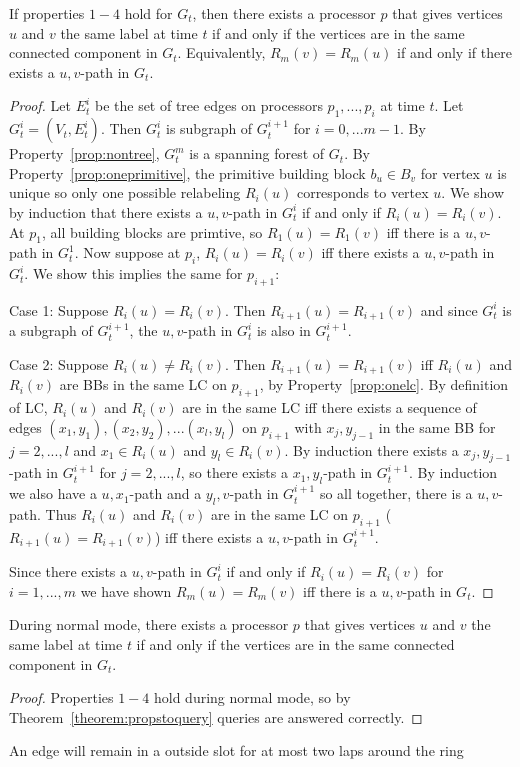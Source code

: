 \begin{theorem}\label{theorem:propstoquery}
If properties $1-4$ hold for $G_t$, then there exists a processor $p$ that gives vertices $u$ and $v$ the same label at time $t$ if and only if the vertices are in the same connected component in $G_t$. Equivalently, $R_m(v) = R_m(u)$ if and only if there exists a $u,v$-path in $G_t$.
\end{theorem}
\begin{proof}
Let $E_t^i$ be the set of tree edges on processors $p_1,...,p_i$ at time $t$. Let $G_t^i = (V_t,E_t^i)$. Then $G_t^i$ is subgraph of $G_t^{i+1}$ for $i = 0,...m-1$. By Property~\ref{prop:nontree}, $G_t^m$ is a spanning forest of $G_t$. By Property~\ref{prop:oneprimitive}, the primitive building block $b_u \in B_v$ for vertex $u$ is unique so only one possible relabeling $R_i(u)$ corresponds to vertex $u$. We show by induction that there exists a $u,v$-path in $G_t^i$ if and only if $R_i(u) = R_i(v)$. At $p_1$, all building blocks are primtive, so $R_1(u) = R_1(v)$ iff there is a $u,v$-path in $G_t^1$.
Now suppose at $p_i$, $R_i(u) = R_i(v)$ iff there exists a $u,v$-path in $G_t^i$. We show this implies the same for $p_{i+1}$:

Case 1: Suppose $R_i(u) =R_i(v)$. Then $R_{i+1}(u)= R_{i+1}(v)$ and since $G_t^i$ is a subgraph of $G_t^{i+1}$, the $u,v$-path in $G_t^i$ is also in $G_t^{i+1}$.

Case 2: Suppose $R_i(u)\neq R_i(v)$. Then $R_{i+1}(u) = R_{i+1}(v)$ iff $R_i(u)$ and $R_i(v)$ are BBs in the same LC on $p_{i+1}$, by Property~\ref{prop:onelc}. By definition of LC, $R_i(u)$ and $R_i(v)$ are in the same LC iff there exists a sequence of edges $(x_1,y_1),(x_2,y_2),...(x_l,y_l)$ on $p_{i+1}$ with $x_j,y_{j-1}$ in the same BB for $j=2,...,l$ and $x_1 \in R_i(u)$ and $y_l \in R_i(v)$. By induction there exists a $x_j,y_{j-1}$-path in $G_t^{i+1}$ for $j=2,...,l$, so there exists a $x_1,y_l$-path in $G_t^{i+1}$. By induction we also have a $u,x_1$-path and a $y_l,v$-path in $G_t^{i+1}$ so all together, there is a $u,v$-path. Thus $R_i(u)$ and $R_i(v)$ are in the same LC on $p_{i+1}$ ($R_{i+1}(u) = R_{i+1}(v)$) iff there exists a $u,v$-path in $G_t^{i+1}$.

Since there exists a $u,v$-path in $G_t^i$ if and only if $R_i(u) = R_i(v)$ for $i = 1,...,m$ we have shown $R_m(u)=R_m(v)$ iff there is a $u,v$-path in $G_t$.
\end{proof}
\begin{theorem}\label{theorem:queriesnormal}
During normal mode, there exists a processor $p$ that gives vertices $u$ and $v$ the same label at time $t$ if and only if the vertices are in the same connected component in $G_t$.
\end{theorem}
\begin{proof}
Properties $1-4$ hold during normal mode, so by Theorem~\ref{theorem:propstoquery} queries are answered correctly.
\end{proof}
 An edge will remain in a outside slot for at most two laps around the ring 

